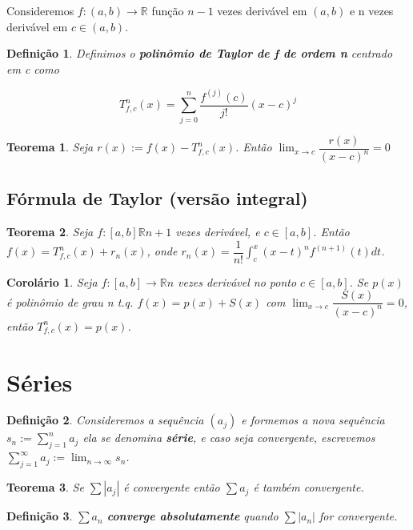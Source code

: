 \documentclass[12pt]{article}
\newtheorem{theorem}{Teorema}[section]
\newtheorem{corollary}{Corolário}[theorem]
\newtheorem{definition}{Definição}
\begin{document}
Consideremos $f: (a, b) \rightarrow{} \mathbb{R}$ função $n-1$ vezes derivável em $(a, b)$ e n vezes derivável em $c \in (a, b)$.

\begin{definition}
    Definimos o \textbf{polinômio de Taylor de f de ordem n} centrado em c como
    
    $$T_{f, c}^n (x) = \sum_{j=0}^n \dfrac{f^{(j)} (c)}{j!} (x-c)^j$$
\end{definition}

\begin{theorem}
    Seja $r(x) := f(x) - T_{f,c}^n (x)$. Então $\lim_{x \rightarrow{} c} \dfrac{r(x)}{(x-c)^n} = 0$
\end{theorem}

\subsection{Fórmula de Taylor (versão integral)}
\label{s12}

\begin{theorem}
    Seja $f: [a, b] \mathbb{R} n+1$ vezes derivável, e $c \in [a, b]$. Então $f(x) = T_{f,c}^n (x) + r_n (x)$, onde $r_n (x) = \dfrac{1}{n!} \int_c^x (x - t)^n f^{(n+1)} (t) d t$.
\end{theorem}

\begin{corollary}
    Seja $f: [a, b] \rightarrow{} \mathbb{R} n$ vezes derivável no ponto $c \in [a, b]$. Se $p(x)$ é polinômio de grau n t.q. $f(x) = p(x) + S(x)$ com $\lim_{x \rightarrow{} c} \dfrac{S(x)}{(x-c)^n} = 0$, então $T_{f,c}^n (x) = p(x)$.
\end{corollary}

\section{Séries}
\label{s13}

\begin{definition}
    Consideremos a sequência $(a_j)$ e formemos a nova sequência $s_n := \sum_{j = 1}^n a_j$ ela se denomina \textbf{série}, e caso seja convergente, escrevemos $\sum_{j = 1}^\infty a_j := \lim_{n \rightarrow{} \infty} s_n$.
\end{definition}

\begin{theorem}
    Se $\sum |a_j|$ é convergente então $\sum a_j$ é também convergente.
\end{theorem}

\begin{definition}
    $\sum a_n$ \textbf{converge absolutamente} quando $\sum |a_n|$ for convergente.
\end{definition}
\end{document}

